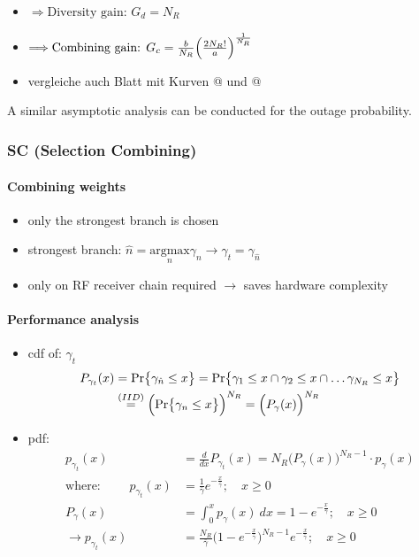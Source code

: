 \documentclass[a4paper, 10pt]{article}
\makeatletter
\newcommand{\Rmnum}[1]{\expandafter\@slowromancap\romannumeral #1@}
\makeatother
\begin{document}
\begin{itemize}
\begin{itemize}
		\item[] $\Longrightarrow \text{Diversity gain: } G_d = N_R$
		\item[] $\Longrightarrow \text{Combining gain: } G_c = \frac{b}{N_R}\Bigl( \frac{2N_R!}{a}\Bigr)^{\frac{1}{N_R}}$
		\item[] vergleiche auch Blatt mit Kurven \Rmnum{3} und \Rmnum{4}
	\end{itemize}
\end{itemize}
A similar asymptotic analysis can be conducted for the outage probability.
\subsubsection{SC (Selection Combining)}
\paragraph{Combining weights}
	\begin{itemize}
		\item only the strongest branch is chosen
		\item strongest branch: $\hat{n} = \underset{n}{\text{argmax}} \gamma _n \longrightarrow \gamma _t = \gamma _{\hat{n}}$
		\item only on RF receiver chain required $\rightarrow$\; saves hardware complexity 
	\end{itemize}
\paragraph{Performance analysis}
	\begin{itemize}
		\item cdf of: $\gamma _t$
			\begin{align*}
				P_{\gamma _t}(x) &= \text{Pr}\bigl\{\gamma _{\hat{n}} \leq x\bigr\} = \text{Pr}\bigl\{\gamma _1 \leq x \cap \gamma _2 \leq x \cap \dots \gamma _{N_R} \leq x\bigr\}\\
				&\overset{(IID)}{=} \Bigl(\text{Pr}\bigl\{\gamma _n \leq x\bigr\}\Bigr)^{N_R} = \Bigl( P_{\gamma}(x)\Bigr)^{N_R}
			\end{align*}
		\item pdf:
			\begin{align*}
				p_{\gamma _t}(x) &= \frac{d}{dx}P_{\gamma _t}(x) = N_R\bigl(P_{\gamma}(x)\bigr)^{N_R-1}\cdot p_{\gamma}(x)\\
				\text{where: }\qquad p_{\gamma _t}(x) &= \frac{1}{\bar{\gamma}}e^{-\frac{x}{\bar{\gamma}}};\quad x\geq 0\\
				P_{\gamma}(x) &= \int_{0}^{x}p_{\gamma}(x)~dx = 1 - e^{-\frac{x}{\bar{\gamma}}};\quad x\geq 0\\
				\rightarrow p_{\gamma _t}(x) &= \frac{N_R}{\bar{\gamma}}\bigl( 1 - e^{-\frac{x}{\bar{\gamma}}}\bigr)^{N_R-1}e^{-\frac{x}{\bar{\gamma}}};\quad x\geq 0
			\end{align*}
	\end{itemize}
\end{document}
